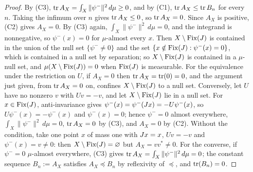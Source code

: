 \begin{proof}
By (C3), \(\operatorname{tr} A_X=\int_X\|\psi^-\|^2\,d\mu\ge 0\), and by (C1),
\(\operatorname{tr} A_X\le\operatorname{tr} B_n\) for every \(n\). Taking the infimum over \(n\) gives
\(\operatorname{tr} A_X\le 0\), so \(\operatorname{tr} A_X=0\). Since \(A_X\) is positive, (C2)
gives \(A_X=0\). By (C3) again, \(\int_X\|\psi^-\|^2\,d\mu=0\), and the
integrand is nonnegative, so \(\psi^-(x)=0\) for \(\mu\)-almost every
\(x\). Then \(X\setminus\mathrm{Fix}(J)\) is contained in the union of the null set
\(\{\psi^-\neq0\}\) and the set \(\{x\notin\mathrm{Fix}(J):\psi^-(x)=0\}\), which is
contained in a null set by separation; so \(X\setminus\mathrm{Fix}(J)\) is contained
in a \(\mu\)-null set, and \(\mu(X\setminus\mathrm{Fix}(J))=0\) when \(\mathrm{Fix}(J)\) is
measurable. For the equivalence under the restriction on \(U\), if \(A_X=0\) then \(\operatorname{tr} A_X=\operatorname{tr}(0)=0\), and the argument just given, from \(\operatorname{tr} A_X=0\) on, confines \(X\setminus\mathrm{Fix}(J)\) to a null set. Conversely, let
\(U\) have no nonzero \(v\) with \(Uv=-v\), and let \(X\setminus\mathrm{Fix}(J)\) lie in
a null set. For \(x\in\mathrm{Fix}(J)\), anti-invariance gives
\(\psi^-(x)=\psi^-(J x)=-U\psi^-(x)\), so \(U\psi^-(x)=-\psi^-(x)\) and
\(\psi^-(x)=0\); hence \(\psi^-=0\) almost everywhere,
\(\int_X\|\psi^-\|^2\,d\mu=0\), \(\operatorname{tr} A_X=0\) by (C3), and \(A_X=0\) by (C2).
Without the condition, take one point \(x\) of mass one with \(J x=x\),
\(Uv=-v\) and \(\psi^-(x)=v\neq0\): then \(X\setminus\mathrm{Fix}(J)=\varnothing\) but
\(A_X=vv^*\neq0\). For the converse, if \(\psi^-=0\) \(\mu\)-almost everywhere, (C3) gives \(\operatorname{tr} A_X=\int_X\|\psi^-\|^2\,d\mu=0\); the constant sequence \(B_n:=A_X\) satisfies \(A_X\preceq B_n\) by reflexivity of \(\preceq\), and \(\operatorname{tr}(B_n)=0\).
\end{proof}

